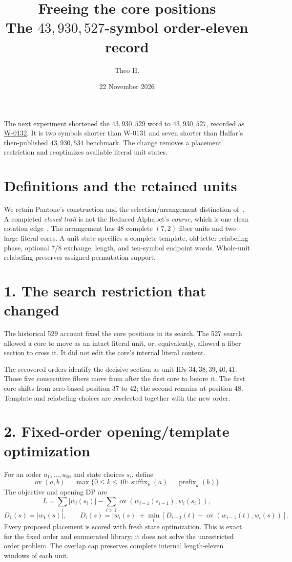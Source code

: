 \documentclass[11pt]{article}
\title{\vspace{-1.5em}Freeing the core positions\\
\large The $43{,}930{,}527$-symbol order-eleven record}
\author{Theo H.}
\date{22 November 2026}
\begin{document}
\maketitle
\vspace{-1.5em}
The next experiment shortened the $43{,}930{,}529$ word to
$43{,}930{,}527$, recorded as
\href{https://superpermutations.com/w/W-0132}{W-0132}.
It is two symbols shorter than W-0131 and seven shorter than Halfar's
then-published $43{,}930{,}534$ benchmark. The change removes a placement
restriction and reoptimizes available literal unit states.

\section*{Definitions and the retained units}
We retain Pantone's construction and the selection/arrangement distinction
of~\cite{pantone,glossary}. A completed \emph{closed trail} is not the
Reduced Alphabet's \emph{course}, which is one clean rotation edge~\cite{spra}.
The arrangement has 48 complete $(7,2)$ fiber units and two large literal
cores. A unit state specifies a complete template, old-letter relabeling
phase, optional 7/8 exchange, length, and ten-symbol endpoint words.
Whole-unit relabeling preserves assigned permutation support.

\section*{1. The search restriction that changed}
The historical 529 account fixed the core positions in its search.
The 527 search allowed a core to move as an intact literal unit, or,
equivalently, allowed a fiber section to cross it. It did not edit the
core's internal literal content.

The recovered orders identify the decisive section as unit IDs
$34,38,39,40,41$. Those five consecutive fibers move from after the first
core to before it. The first core shifts from zero-based position 37 to 42;
the second remains at position 48. Template and relabeling choices are
reselected together with the new order.

\section*{2. Fixed-order opening/template optimization}
For an order $u_1,\ldots,u_{50}$ and state choices $s_i$, define
\[
\operatorname{ov}(a,b)=\max\{0\leq k\leq10:
\operatorname{suffix}_k(a)=\operatorname{prefix}_k(b)\}.
\]
The objective and opening DP are
\[
L=\sum_i|w_i(s_i)|-\sum_{i>1}\operatorname{ov}(w_{i-1}(s_{i-1}),w_i(s_i)),
\]
\[
D_1(s)=|w_1(s)|,\qquad
D_i(s)=|w_i(s)|+\min_t[D_{i-1}(t)-\operatorname{ov}(w_{i-1}(t),w_i(s))].
\]
Every proposed placement is scored with fresh state optimization. This is
exact for the fixed order and enumerated library; it does not solve the
unrestricted order problem. The overlap cap preserves complete internal
length-eleven windows of each unit.
\end{document}
